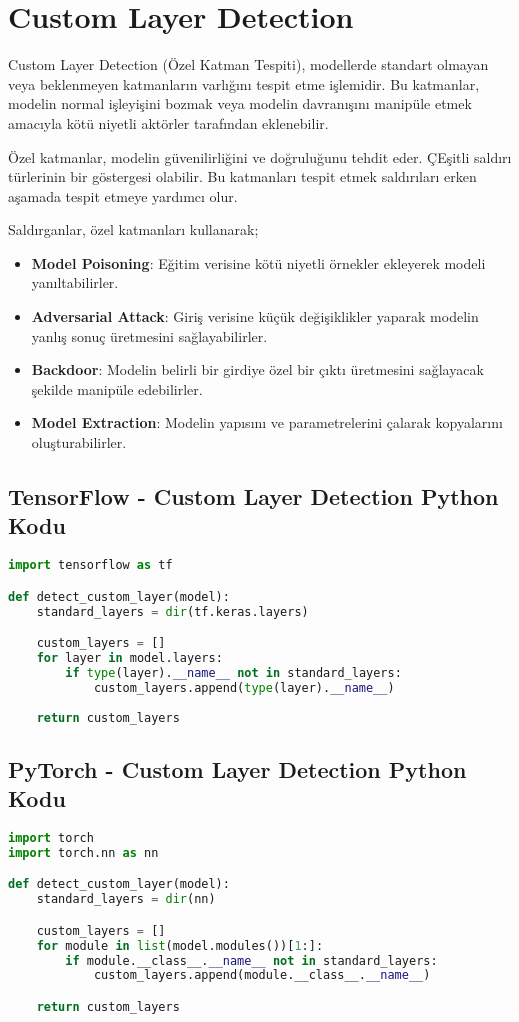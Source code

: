 \section{Custom Layer Detection}

Custom Layer Detection (Özel Katman Tespiti), modellerde standart olmayan veya beklenmeyen katmanların varlığını tespit etme işlemidir. Bu katmanlar, modelin normal işleyişini bozmak veya modelin davranışını manipüle etmek amacıyla kötü niyetli aktörler tarafından eklenebilir.

Özel katmanlar, modelin güvenilirliğini ve doğruluğunu tehdit eder. ÇEşitli saldırı türlerinin bir göstergesi olabilir. Bu katmanları tespit etmek saldırıları erken aşamada tespit etmeye yardımcı olur.

Saldırganlar, özel katmanları kullanarak;

\begin{itemize}
    \item \textbf{Model Poisoning}: Eğitim verisine kötü niyetli örnekler ekleyerek modeli yanıltabilirler.
    \item \textbf{Adversarial Attack}: Giriş verisine küçük değişiklikler yaparak modelin yanlış sonuç üretmesini sağlayabilirler.
    \item \textbf{Backdoor}: Modelin belirli bir girdiye özel bir çıktı üretmesini sağlayacak şekilde manipüle edebilirler.
    \item \textbf{Model Extraction}: Modelin yapısını ve parametrelerini çalarak kopyalarını oluşturabilirler.
\end{itemize}

\subsection{TensorFlow - Custom Layer Detection Python Kodu}

\begin{lstlisting}[language=Python]
import tensorflow as tf

def detect_custom_layer(model):
    standard_layers = dir(tf.keras.layers)

    custom_layers = []
    for layer in model.layers:
        if type(layer).__name__ not in standard_layers:
            custom_layers.append(type(layer).__name__)
            
    return custom_layers
\end{lstlisting}

\subsection{PyTorch - Custom Layer Detection Python Kodu}

\begin{lstlisting}[language=Python]
import torch
import torch.nn as nn

def detect_custom_layer(model):
    standard_layers = dir(nn)

    custom_layers = []
    for module in list(model.modules())[1:]:
        if module.__class__.__name__ not in standard_layers:
            custom_layers.append(module.__class__.__name__)

    return custom_layers
\end{lstlisting}

\newpage